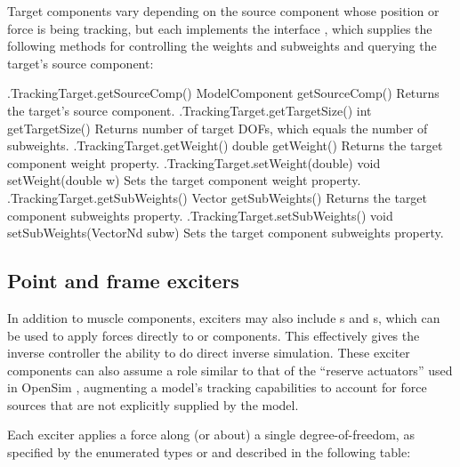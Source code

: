 Target components vary depending on the source component whose position or
force is being tracking, but each implements the interface
, which supplies
the following methods for controlling the weights and subweights and querying
the target's source component:
%
\begin{methodtable}{0.5}{0.5}
\midline
%
\methodentry
{\inverse.TrackingTarget.getSourceComp()}%
{ModelComponent getSourceComp()}%
{Returns the target's source component.}%
%
\methodentry
{\inverse.TrackingTarget.getTargetSize()}%
{int getTargetSize()}%
{Returns number of target DOFs, which equals the number of
subweights.}%
%
\methodspace{0.5em}
%
\methodentry
{\inverse.TrackingTarget.getWeight()}%
{double getWeight()}%
{Returns the target component {\sf weight} property.}%
%
\methodentry
{\inverse.TrackingTarget.setWeight(double)}%
{void setWeight(double w)}%
{Sets the target component {\sf weight} property.}%
%
\methodentry
{\inverse.TrackingTarget.getSubWeights()}%
{Vector getSubWeights()}%
{Returns the target component {\sf subweights} property.}%
%
\methodentry
{\inverse.TrackingTarget.setSubWeights()}%
{void setSubWeights(VectorNd subw)}%
{Sets the target component {\sf subweights} property.}%
%
\midline
\end{methodtable}
%

\subsection{Point and frame exciters}

In addition to muscle components, exciters may also include
s and
s, which can be used
to apply forces directly to
 or
 components. This effectively gives the inverse
controller the ability to do direct inverse simulation. These exciter
components can also assume a role similar to that of the ``reserve actuators''
used in OpenSim \cite{delp2007opensim}, augmenting a model's tracking
capabilities to account for force sources that are not explicitly supplied by
the model.

Each exciter applies a force along (or about) a single degree-of-freedom, as
specified by the enumerated types
 or
 and described
in the following table:

